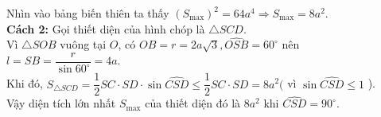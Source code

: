 \begin{ex}
{\begin{center}
		\end{center}
		Nhìn vào bảng biến thiên ta thấy $\left(S_{\max }\right)^2=64 a^4 \Rightarrow S_{\max }=8 a^2$.\\
		\textbf{Cách 2:} Gọi thiết diện của hình chóp là $\triangle S C D$.\\
		Vì $\triangle S O B$ vuông tại $O$, có $O B=r=2 a \sqrt{3}, \widehat{O S B}=60^{\circ}$ nên $l=S B=\dfrac{r}{\sin 60^{\circ}}=4 a$.\\
		Khi đó, $S_{\triangle S C D}=\dfrac{1}{2} S C \cdot S D \cdot \sin \widehat{C S D} \leq \dfrac{1}{2} S C \cdot S D=8 a^2($ vì $\sin \widehat{C S D} \leq 1$ ).\\
		Vậy diện tích lớn nhất $S_{\max }$ của thiết diện đó là $8 a^2$ khi $\widehat{C S D}=90^{\circ}$.
	}
\end{ex}

